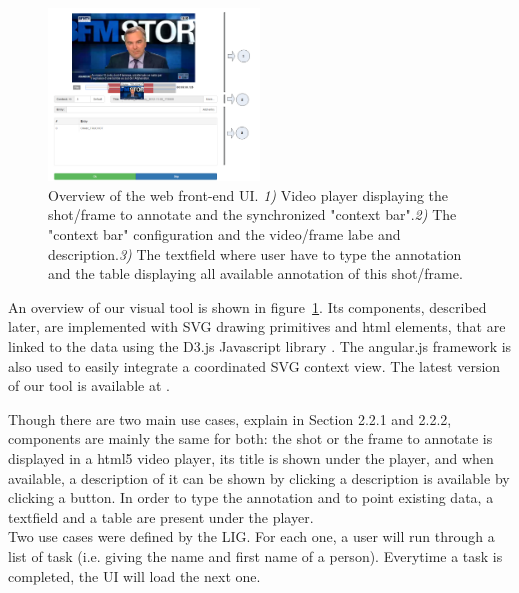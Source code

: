 \documentclass[a4paper]{article}
\begin{document}
\begin{figure}[h]
 	\includegraphics[width=0.5\textwidth]{camomile_ui.png}
	\caption{Overview of the web front-end UI. \emph{1)} Video player displaying the shot/frame to annotate and the synchronized "context bar".\emph{2)} The "context bar" configuration and the video/frame labe and description.\emph{3)} The textfield where user have to type the annotation and the table displaying all available annotation of this shot/frame.}
	\label{fig:front-end-UI}

\end{figure}


An overview of our visual tool is shown in figure~\ref{fig:front-end-UI}. Its components, described later, are implemented with SVG drawing primitives and html elements, that are linked to the data using the D3.js Javascript library \cite{d3js}. The angular.js framework \cite{angularjs} is also used to easily integrate a coordinated SVG context view. The latest version of our tool is available at \cite{url-front-end}.

Though there are two main use cases, explain in Section 2.2.1 and 2.2.2, components are mainly the same for both: the shot or the frame to annotate is displayed in a html5 video player, its title is shown under the player, and when available, a description of it can be shown by clicking a description is available by clicking a button. In order to type the annotation and to point existing data, a textfield and a table are present under the player.\\

Two use cases were defined by the LIG. For each one, a user will run through a list of task (i.e. giving the name and first name of a person). Everytime a task is completed, the UI will load the next one.
\end{document}
